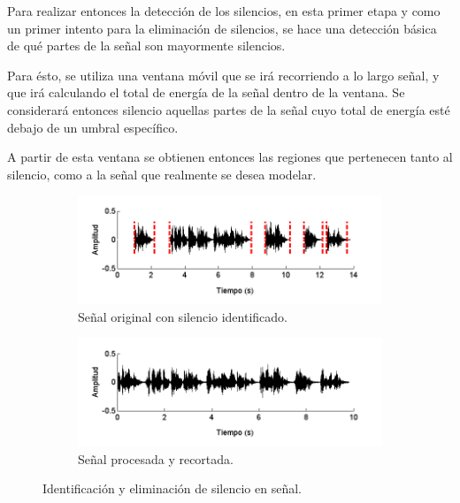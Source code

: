 
Para realizar entonces la detección de los silencios, en esta primer etapa y como un primer intento para la eliminación de silencios, se hace una detección básica de qué partes de la señal son mayormente silencios.

Para ésto, se utiliza una ventana móvil que se irá recorriendo a lo largo señal, y que irá calculando el total de energía de la señal dentro de la ventana. Se considerará entonces silencio aquellas partes de la señal cuyo total de energía esté debajo de un umbral específico.

A partir de esta ventana se obtienen entonces las regiones que pertenecen tanto al silencio, como a la señal que realmente se desea modelar.

\begin{figure}[bth]
  \begin{subfigure}[b]{\textwidth}
    \includegraphics[width=0.9\linewidth]{gfx/chap5/signal-silence}
    \caption{Señal original con silencio identificado.}
    \label{fig:sign_silence}  
  \end{subfigure}

  \begin{subfigure}[b]{\textwidth}
    \includegraphics[width=0.9\linewidth]{gfx/chap5/signal-trunc}
    \caption{Señal procesada y recortada.}
    \label{fig:sign_trunc}  
  \end{subfigure}
  
  \caption{Identificación y eliminación de silencio en señal.}  
  \label{fig:sign_ident}  
\end{figure}

